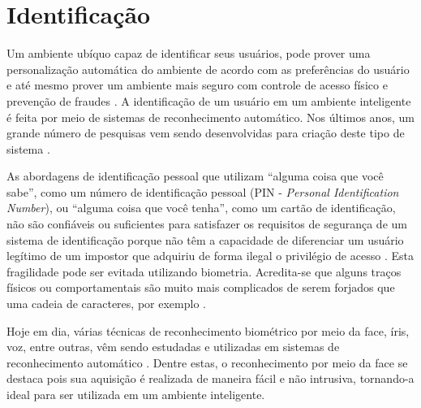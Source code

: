 	
	

	

\section{Identificação}
	
	Um ambiente ubíquo capaz de identificar seus usuários, pode prover uma
	personalização automática do ambiente de acordo com as preferências do usuário e
	até mesmo prover um ambiente mais seguro com controle de acesso físico e
	prevenção de fraudes \cite{saocarlos}. A identificação de um usuário em um
	ambiente inteligente é feita por meio de sistemas de reconhecimento automático.
	Nos últimos anos, um grande número de pesquisas vem sendo desenvolvidas para
	criação deste tipo de sistema  \cite{saocarlos}.
	
	As abordagens de identificação pessoal que utilizam ``alguma coisa que você
	sabe'', como um número de identificação pessoal (PIN - \textit{Personal
	Identification Number}), ou ``alguma coisa que você tenha'', como um cartão de identificação,
	não são confiáveis ou suficientes para satisfazer os requisitos de segurança de
	um sistema de identificação porque não têm a capacidade de diferenciar um usuário
	legítimo de um impostor que adquiriu de forma ilegal o privilégio de acesso
	\cite{hong}. Esta fragilidade pode ser evitada utilizando biometria.
	Acredita-se que alguns traços físicos ou comportamentais são muito mais
	complicados de serem forjados que uma cadeia de caracteres, por exemplo
	\cite{drovetto}.
	
	Hoje em dia, várias técnicas de reconhecimento biométrico por meio da face,
	íris, voz, entre outras, vêm sendo estudadas e utilizadas em sistemas de
	reconhecimento automático \cite{bolle}. Dentre estas, o reconhecimento por meio
	da face se destaca pois sua aquisição é realizada de maneira fácil e não
	intrusiva, tornando-a ideal para ser utilizada em um ambiente inteligente.
	


	
	
